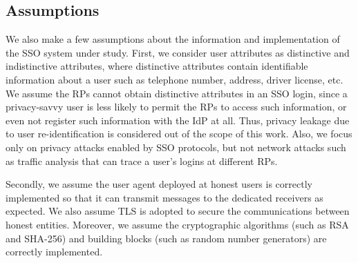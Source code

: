 \subsection{Assumptions}
We also make a few assumptions about the information and implementation of the SSO system under study. First, we consider user attributes as distinctive and indistinctive attributes, where distinctive attributes contain identifiable information about a user such as telephone number, address, driver license, etc. We assume the RPs cannot obtain distinctive attributes in an SSO login, since a privacy-savvy user is less likely to permit the RPs to access such information, or even not register such information with the IdP at all. Thus, privacy leakage due to user re-identification is considered out of the scope of this work. Also, we focus only on privacy attacks enabled by SSO protocols, but not network attacks such as traffic analysis that can trace a user's logins at different RPs.

Secondly, we assume the user agent deployed at honest users is correctly implemented so that it can transmit messages to the dedicated receivers as expected. We also assume TLS is adopted to secure the communications between honest entities. Moreover, we assume the cryptographic algorithms (such as RSA and SHA-256) and building blocks (such as random number generators) are correctly implemented.






